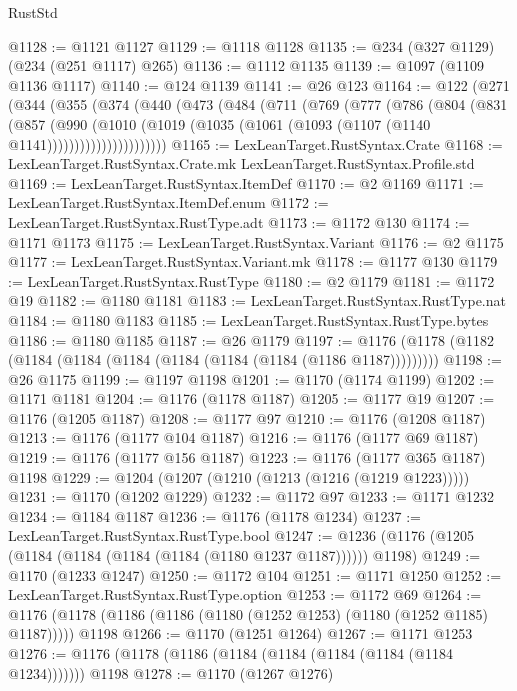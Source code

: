 \begin{lexlean}{RustStd}
\begin{coremodule}
@1128 := @1121 @1127
@1129 := @1118 @1128
@1135 := @234 (@327 @1129) (@234 (@251 @1117) @265)
@1136 := @1112 @1135
@1139 := @1097 (@1109 @1136 @1117)
@1140 := @124 @1139
@1141 := @26 @123
@1164 := @122
    (@271
      (@344
        (@355
          (@374
            (@440
              (@473
                (@484
                  (@711
                    (@769
                      (@777
                        (@786
                          (@804
                            (@831
                              (@857
                                (@990
                                  (@1010
                                    (@1019
                                      (@1035 (@1061 (@1093 (@1107 (@1140 @1141))))))))))))))))))))))
@1165 := LexLeanTarget.RustSyntax.Crate
@1168 := LexLeanTarget.RustSyntax.Crate.mk LexLeanTarget.RustSyntax.Profile.std
@1169 := LexLeanTarget.RustSyntax.ItemDef
@1170 := @2 @1169
@1171 := LexLeanTarget.RustSyntax.ItemDef.enum
@1172 := LexLeanTarget.RustSyntax.RustType.adt
@1173 := @1172 @130
@1174 := @1171 @1173
@1175 := LexLeanTarget.RustSyntax.Variant
@1176 := @2 @1175
@1177 := LexLeanTarget.RustSyntax.Variant.mk
@1178 := @1177 @130
@1179 := LexLeanTarget.RustSyntax.RustType
@1180 := @2 @1179
@1181 := @1172 @19
@1182 := @1180 @1181
@1183 := LexLeanTarget.RustSyntax.RustType.nat
@1184 := @1180 @1183
@1185 := LexLeanTarget.RustSyntax.RustType.bytes
@1186 := @1180 @1185
@1187 := @26 @1179
@1197 := @1176 (@1178 (@1182 (@1184 (@1184 (@1184 (@1184 (@1184 (@1184 (@1186 @1187)))))))))
@1198 := @26 @1175
@1199 := @1197 @1198
@1201 := @1170 (@1174 @1199)
@1202 := @1171 @1181
@1204 := @1176 (@1178 @1187)
@1205 := @1177 @19
@1207 := @1176 (@1205 @1187)
@1208 := @1177 @97
@1210 := @1176 (@1208 @1187)
@1213 := @1176 (@1177 @104 @1187)
@1216 := @1176 (@1177 @69 @1187)
@1219 := @1176 (@1177 @156 @1187)
@1223 := @1176 (@1177 @365 @1187) @1198
@1229 := @1204 (@1207 (@1210 (@1213 (@1216 (@1219 @1223)))))
@1231 := @1170 (@1202 @1229)
@1232 := @1172 @97
@1233 := @1171 @1232
@1234 := @1184 @1187
@1236 := @1176 (@1178 @1234)
@1237 := LexLeanTarget.RustSyntax.RustType.bool
@1247 := @1236 (@1176 (@1205 (@1184 (@1184 (@1184 (@1184 (@1180 @1237 @1187)))))) @1198)
@1249 := @1170 (@1233 @1247)
@1250 := @1172 @104
@1251 := @1171 @1250
@1252 := LexLeanTarget.RustSyntax.RustType.option
@1253 := @1172 @69
@1264 := @1176 (@1178 (@1186 (@1186 (@1180 (@1252 @1253) (@1180 (@1252 @1185) @1187))))) @1198
@1266 := @1170 (@1251 @1264)
@1267 := @1171 @1253
@1276 := @1176 (@1178 (@1186 (@1184 (@1184 (@1184 (@1184 (@1184 @1234))))))) @1198
@1278 := @1170 (@1267 @1276)

\end{coremodule}
\end{lexlean}
